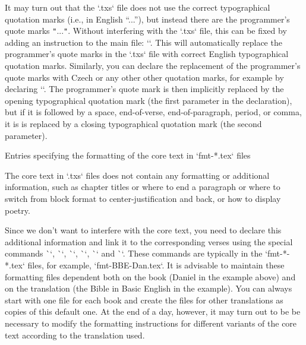 It may turn out that the `.txs` file does not use the correct typographical quotation marks (i.e., in English “...”), but instead there are the programmer's quote marks {\tt"}...{\tt"}. 
Without interfering with the `.txs` file, this can be fixed by adding an instruction to
the main file:
``.
This will automatically replace the programmer's quote marks in the `.txs` file with correct English  typographical quotation marks. 
Similarly, you can declare the replacement of the programmer's quote marks
with Czech or any other other quotation marks, for example by declaring
``.
The programmer's quote mark is then implicitly
replaced by the opening typographical quotation mark (the first parameter in the 
declaration), but if it is followed by a space, end-of-verse, end-of-paragraph, period, 
or comma, it is is replaced by a closing typographical quotation mark (the second 
parameter).

\secc[fmt] Entries specifying the formatting of the core text in `fmt-*.tex` files

The core text in `.txs` files does not contain any formatting or additional information, 
such as chapter titles or where to end a paragraph or where to switch from block format 
to center-justification   and back, or how to display poetry.


Since we don't want to interfere with the core text, 
you need to declare this additional information and link it to the corresponding verses using the special commands \`\fmtadd`, \`\fmtpre`, \`\fmtins`, \`\fmtfont`, \`\fmtkeep` and \`\fmtrepl`. 
These commands are typically in the `fmt-*-*.tex` files,
for example, `fmt-BBE-Dan.tex`. It is advisable to maintain these formatting files
dependent both on the book (Daniel in the example above) and on the translation (the Bible in Basic English in the example). 
You can always start with one file for each book and  create the files for  other translations as copies of this default one.  At the end of a day, 
however, it may turn out to be be necessary to modify the formatting instructions for different variants of the core text according to the translation used.


